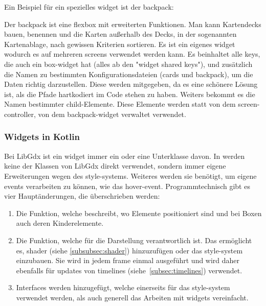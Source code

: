 Ein Beispiel für ein spezielles widget ist der backpack:
Der backpack ist eine flexbox mit erweiterten Funktionen.
Man kann Kartendecks bauen, benennen und die Karten außerhalb des Decks, in der sogenannten Kartenablage, nach gewissen Kriterien sortieren.
Es ist ein eigenes widget wodurch es auf mehreren screens verwendet werden kann.
Es beinhaltet alle keys, die auch ein box-widget hat (alles ab den "widget shared keys"), und zusätzlich die Namen zu bestimmten Konfigurationsdateien (cards und backpack), um die Daten richtig darzustellen.
Diese werden mitgegeben, da es eine schönere Lösung ist, als die Pfade hartkodiert im Code stehen zu haben.
Weiters bekommt es die Namen bestimmter child-Elemente.
Diese Elemente werden statt von dem screen-controller, von dem backpack-widget verwaltet \bzw verwendet.

\renewcommand{\kapitelautor}{Autor: Felix Zwickelstorfer}
\subsubsection{Widgets in Kotlin}\label{subsubsec:widgetsinkotlin}
\renewcommand{\kapitelautor}{Autor: Felix Zwickelstorfer}
Bei LibGdx ist ein widget immer ein  oder eine Unterklasse davon.
In \FF werden keine der Klassen von LibGdx direkt verwendet, sondern immer eigene Erweiterungen \zB wegen des style-systems.
Weiteres werden sie benötigt, um eigene events verarbeiten zu können, wie das hover-event.
Programmtechnisch gibt es vier Hauptänderungen, die überschrieben werden:
\begin{enumerate}
    \item Die  Funktion, welche beschreibt, wo Elemente positioniert sind und bei Boxen auch deren Kinderelemente.
    \item Die  Funktion, welche für die Darstellung verantwortlich ist. Das ermöglicht es, shader (siehe \ref{subsubsec:shader}) hinzuzufügen oder das style-system einzubauen.
    Sie wird in jedem frame einmal ausgeführt und wird daher ebenfalls für updates von timelines (siehe~\ref{subsec:timelines}) verwendet.
    \item Interfaces werden hinzugefügt, welche einerseits für das style-system verwendet werden, als auch generell das Arbeiten mit widgets vereinfacht.
\end{enumerate}
\renewcommand{\kapitelautor}{Autor: Felix Zwickelstorfer}

